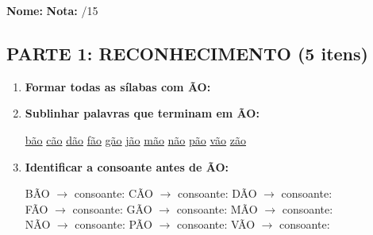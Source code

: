 \begin{exercicio}

\noindent\textbf{Nome:} \underline{\hspace{4cm}} \quad \textbf{Nota:} \underline{\hspace{1cm}}/15

\subsection*{PARTE 1: RECONHECIMENTO (5 itens)}

\begin{enumerate}
  \item \textbf{Formar todas as sílabas com ÃO:}
  \begin{center}
  \end{center}

  \item \textbf{Sublinhar palavras que terminam em ÃO:}
  \begin{center}
  \uline{bão} \quad \uline{cão} \quad \uline{dão} \quad \uline{fão} \quad \uline{gão} \quad \uline{jão} \quad \uline{mão} \quad \uline{não} \quad \uline{pão} \quad \uline{vão} \quad \uline{zão}
  \end{center}

  \item \textbf{Identificar a consoante antes de ÃO:}
  \begin{center}
  BÃO $\rightarrow$ consoante: \underline{\hspace{1cm}} \quad CÃO $\rightarrow$ consoante: \underline{\hspace{1cm}} \quad DÃO $\rightarrow$ consoante: \underline{\hspace{1cm}} \\
  FÃO $\rightarrow$ consoante: \underline{\hspace{1cm}} \quad GÃO $\rightarrow$ consoante: \underline{\hspace{1cm}} \quad MÃO $\rightarrow$ consoante: \underline{\hspace{1cm}} \\
  NÃO $\rightarrow$ consoante: \underline{\hspace{1cm}} \quad PÃO $\rightarrow$ consoante: \underline{\hspace{1cm}} \quad VÃO $\rightarrow$ consoante: \underline{\hspace{1cm}}
  \end{center}


\end{enumerate}
\end{exercicio}

